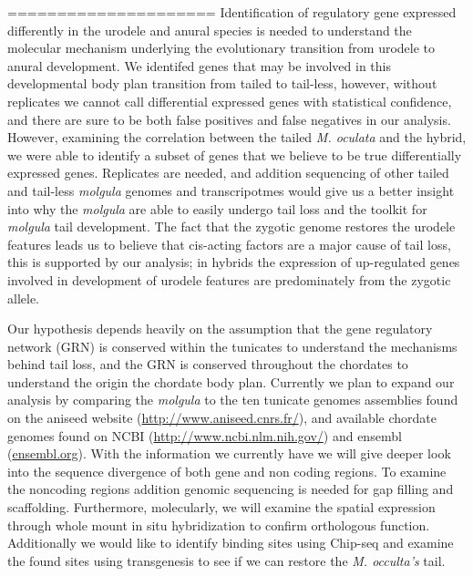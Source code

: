 =====================
Identification of regulatory gene expressed differently in the urodele and anural species is needed to understand the molecular mechanism underlying the evolutionary transition from urodele to anural development. We identifed genes that may be involved in this developmental body plan transition from tailed to tail-less, however, without replicates we cannot call differential expressed genes with statistical confidence, and there are sure to be both false positives and false negatives in our analysis. However, examining the correlation between the tailed \textit{M. oculata} and the hybrid, we were able to identify a subset of genes that we believe to be true differentially expressed genes. Replicates are needed, and addition sequencing of other tailed and tail-less \textit{molgula} genomes and transcripotmes would give us a better insight into why the \textit{molgula} are able to easily undergo tail loss and the toolkit for \textit{molgula} tail development. The fact that the zygotic genome restores the urodele features leads us to believe that cis-acting factors are a major cause of tail loss, this is supported by our analysis; in hybrids the expression of up-regulated genes involved in development of urodele features are predominately from the zygotic allele.

Our hypothesis depends heavily on the assumption that the gene regulatory network (GRN) is conserved within the tunicates to understand the mechanisms behind tail loss, and the GRN is conserved throughout the chordates to understand the origin the chordate body plan. Currently we plan to expand our analysis by comparing the \textit{molgula} to the ten tunicate genomes assemblies found on the aniseed website (\url{http://www.aniseed.cnrs.fr/}), and available chordate genomes found on NCBI (\url{http://www.ncbi.nlm.nih.gov/}) and ensembl (\url{ensembl.org}). With the information we currently have we will give deeper look into the sequence divergence of both gene and non coding regions. To examine the noncoding regions addition genomic sequencing is needed for gap filling and scaffolding. Furthermore, molecularly, we will examine the spatial expression through whole mount in situ hybridization to confirm orthologous function.  Additionally we would like to identify binding sites using Chip-seq and examine the found sites using transgenesis to see if we can restore the \textit{M. occulta's} tail.
